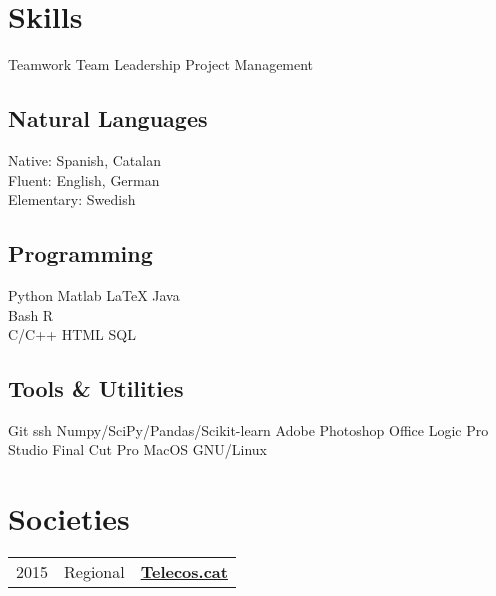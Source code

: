 \documentclass[]{deedy-resume}
\begin{document}
\begin{minipage}[t]{0.43\textwidth}

\section{Skills}
Teamwork \textbullet{} Team Leadership \textbullet{} Project Management\\

\subsection{Natural Languages}
Native: Spanish, Catalan \\
Fluent: English, German \\
Elementary: Swedish\\

\subsection{Programming}
Python \textbullet{}   Matlab  \textbullet{} \LaTeX  \textbullet{} Java  \\
Bash \textbullet{} R \\
C/C++ \textbullet{} HTML \textbullet{} SQL\\

\subsection{Tools \& Utilities}
Git \textbullet{} ssh \textbullet{} Numpy/SciPy/Pandas/Scikit-learn \textbullet{} Adobe Photoshop \textbullet{} Office \textbullet{} Logic Pro Studio \textbullet{} Final Cut Pro \textbullet{} MacOS \textbullet{} GNU/Linux \\

\sectionsep


\section{Societies}
\begin{tabular}{rll}
2015         & Regional  & \textbf{\href{www.telecos.cat}{Telecos.cat}}\\
\end{tabular}
\sectionsep


\end{minipage}
\end{document}
